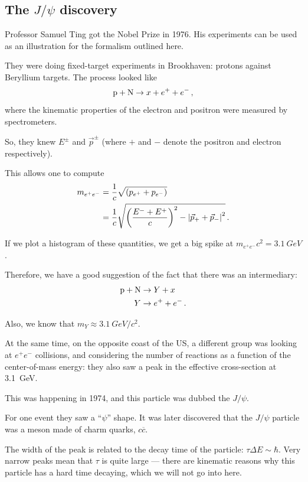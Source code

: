 \documentclass[main.tex]{subfiles}
\begin{document}
\subsection{The \(J/\psi \) discovery}

Professor Samuel Ting got the Nobel Prize in 1976. 
His experiments can be used as an illustration for the formalism outlined here.

They were doing fixed-target experiments in Brookhaven: protons against Beryllium targets. 
The process looked like 
%
\begin{align}
\ce{p} + \ce{N} \to x + e^{+} + e^{-}
\,,
\end{align}
%
where the kinematic properties of the electron and positron were measured by spectrometers. 

So, they knew \(E^{\pm}\) and \(\vec{p}^{\pm}\) (where \(+\) and \(-\) denote the positron and electron respectively). 

This allows one to compute 
%
\begin{align}
m_{e^{+} e^{-}} &= \frac{1}{c} \sqrt{(p_{e^{+}} + p_{e^{-}})}   \\
&= \frac{1}{c} \sqrt{\qty(\frac{E^{-} + E^{+}}{c})^2
- \abs{\vec{p}_+ + \vec{p}_-}^2} 
\,.
\end{align}

If we plot a histogram of these quantities, we get a big spike at \(m_{e^{+}e^{-}}c^2 = \SI{3.1}{GeV}\).

Therefore, we have a good suggestion of the fact that there was an intermediary: 
%
\begin{align}
\ce{p} + \ce{N} &\to Y +x  \\
Y  &\to e^{+} + e^{-}
\,.
\end{align}

Also, we know that \(m_Y \approx \SI{3.1}{GeV} / c^2\). 

At the same time, on the opposite coast of the US, a different group was looking at \(e^{+}e^{-}\) collisions, and considering the number of reactions as a function of the center-of-mass energy: they also saw a peak in the effective cross-section at \SI{3.1}{GeV}. 

This was happening in 1974, and this particle was dubbed the \(J/\psi \). 

For one event they saw a ``\(\psi \)'' shape. 
It was later discovered that the \(J/\psi \) particle was a meson made of charm quarks, \(c \overline{c}\).

The width of the peak is related to the decay time of the particle: \(\tau \Delta E \sim \hbar\). 
Very narrow peaks mean that \(\tau \) is quite large --- there are kinematic reasons why this particle has a hard time decaying, which we will not go into here. 
\end{document}
